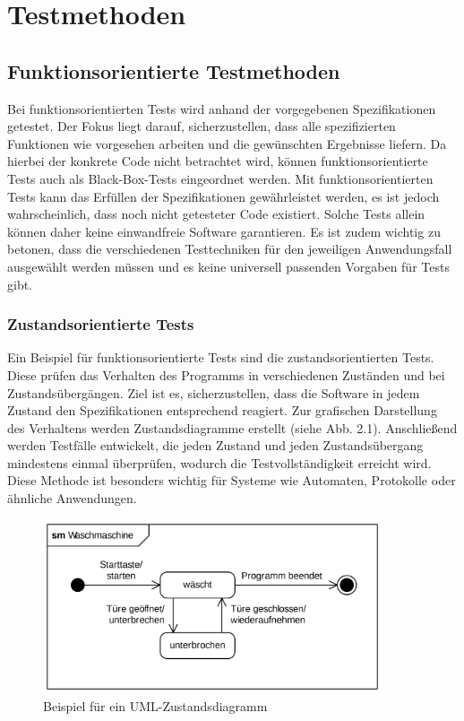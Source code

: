 \documentclass[	%
		fontsize=11pt,  %
		a4paper,	    %
		ngerman,		%
		sans,			%
		f4,				%
	]{HsH-report}		%
\begin{document}
\section{Testmethoden}

\subsection{Funktionsorientierte Testmethoden}
Bei funktionsorientierten Tests wird anhand der vorgegebenen Spezifikationen
getestet. Der Fokus liegt darauf, sicherzustellen, dass alle spezifizierten
Funktionen wie vorgesehen arbeiten und die gewünschten Ergebnisse liefern. Da
hierbei der konkrete Code nicht betrachtet wird, können funktionsorientierte
Tests auch als Black-Box-Tests eingeordnet werden. Mit funktionsorientierten
Tests kann das Erfüllen der Spezifikationen gewährleistet werden, es ist jedoch
wahrscheinlich, dass noch nicht getesteter Code existiert. Solche Tests allein
können daher keine einwandfreie Software garantieren. Es ist zudem wichtig zu
betonen, dass die verschiedenen Testtechniken für den jeweiligen Anwendungsfall
ausgewählt werden müssen und es keine universell passenden Vorgaben für Tests
gibt. \cite{liggesmeyer:qualitaet}

\subsubsection{Zustandsorientierte Tests}
Ein Beispiel für funktionsorientierte Tests sind die zustandsorientierten
Tests. Diese prüfen das Verhalten des Programms in verschiedenen Zuständen und
bei Zustandsübergängen. Ziel ist es, sicherzustellen, dass die Software in
jedem Zustand den Spezifikationen entsprechend reagiert. Zur grafischen
Darstellung des Verhaltens werden Zustandsdiagramme erstellt (siehe Abb. 2.1).
Anschließend werden Testfälle entwickelt, die jeden Zustand und jeden
Zustandsübergang mindestens einmal überprüfen, wodurch die Testvollständigkeit
erreicht wird. \cite{liggesmeyer:qualitaet} Diese Methode ist besonders wichtig
für Systeme wie Automaten, Protokolle oder ähnliche Anwendungen.

\begin{figure}
	\centering
	\includegraphics[width=10cm]{UML-Zustandsdiagram.png}
	\caption{Beispiel für ein UML-Zustandsdiagramm \cite{wikipedia:Zustandsdiagramm}}
\end{figure}
\end{document}
